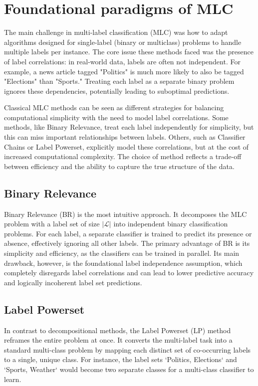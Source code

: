 \chapter{Foundational paradigms of MLC}
The main challenge in multi-label classification (MLC) was how to adapt algorithms designed for single-label (binary or multiclass) problems to handle multiple labels per instance. The core issue these methods faced was the presence of label correlations: in real-world data, labels are often not independent. For example, a news article tagged "Politics" is much more likely to also be tagged "Elections" than "Sports." Treating each label as a separate binary problem ignores these dependencies, potentially leading to suboptimal predictions.

Classical MLC methods can be seen as different strategies for balancing computational simplicity with the need to model label correlations. Some methods, like Binary Relevance, treat each label independently for simplicity, but this can miss important relationships between labels. Others, such as Classifier Chains or Label Powerset, explicitly model these correlations, but at the cost of increased computational complexity. The choice of method reflects a trade-off between efficiency and the ability to capture the true structure of the data.

\section{Binary Relevance}
Binary Relevance (BR) is the most intuitive approach. It decomposes the MLC problem with a label set of size $|\mathcal{L}|$ into independent binary classification problems. For each label, a separate classifier is trained to predict its presence or absence, effectively ignoring all other labels. \cite{zhang_binary_2018} The primary advantage of BR is its simplicity and efficiency, as the classifiers can be trained in parallel. Its main drawback, however, is the foundational label independence assumption, which completely disregards label correlations and can lead to lower predictive accuracy and logically incoherent label set predictions. \cite{Sucar2014Multi-label}

\section{Label Powerset}
In contrast to decompositional methods, the Label Powerset (LP) method reframes the entire problem at once. It converts the multi-label task into a standard multi-class problem by mapping each distinct set of co-occurring labels to a single, unique class. For instance, the label sets `{Politics, Elections}` and `{Sports, Weather}` would become two separate classes for a multi-class classifier to learn. \cite{Read2011}

